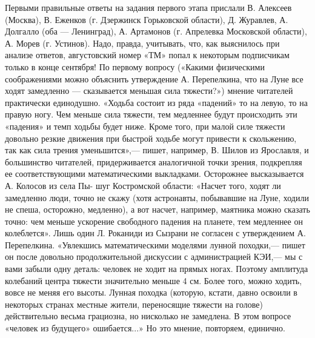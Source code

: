 \documentclass[11pt,a4paper,oneside]{article}
\begin{document}
Первыми правильные ответы на задания первого этапа прислали В. Алексеев (Москва), В. Еженков (г. Дзержинск Горьковской области), Д. Журавлев, А. Долгалло (оба — Ленинград), А. Артамонов (г. Апрелевка Московской области), А. Морев (г. Устинов). Надо, правда, учитывать, что, как выяснилось при анализе ответов, августовский номер «ТМ» попал к некоторым подписчикам только в конце сентября! По первому вопросу («Какими физическими соображениями можно объяснить утверждение А. Перепелкина, что на Луне все ходят замедленно — сказывается меньшая сила тяжести?») мнение читателей практически единодушно. «Ходьба состоит из ряда «падений» то на левую, то на правую ногу. Чем меньше сила тяжести, тем медленнее будут происходить эти «падения» и темп ходьбы будет ниже. Кроме того, при малой силе тяжести довольно резкие движения при быстрой ходьбе могут привести к скольжению, так как сила трения уменьшится»,— пишет, например, В. Шилов из Ярославля, и большинство читателей, придерживается аналогичной точки зрения, подкрепляя ее соответствующими математическими выкладками. Осторожнее высказывается А. Колосов из села Пы- шуг Костромской области: «Насчет того, ходят ли замедленно люди, точно не скажу (хотя астронавты, побывавшие на Луне, ходили не спеша, осторожно, медленно), а вот насчет, например, маятника можно сказать точно: чем меньше ускорение свободного падения на планете, тем медленнее он колеблется». Лишь один Л. Роканиди из Сызрани не согласен с утверждением А. Перепелкина. «Увлекшись математическими моделями лунной походки,— пишет он после довольно продолжительной дискуссии с администрацией КЭИ,— мы с вами забыли одну деталь: человек не ходит на прямых ногах. Поэтому амплитуда колебаний центра тяжести значительно меньше 4 см. Более того, можно ходить, вовсе не меняя его высоты. Лунная походка (которую, кстати, давно освоили в некоторых странах местные жители, переносящие тяжести на голове) действительно весьма грациозна, но нисколько не замедлена. В этом вопросе «человек из будущего» ошибается...» Но это мнение, повторяем, единично.
\end{document}
